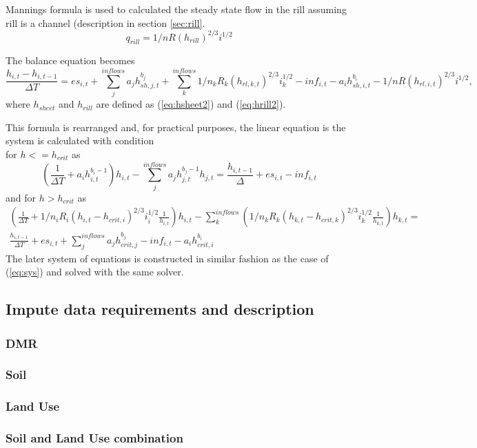         Mannings formula is used to calculated the steady state flow in
        the rill assuming rill is a channel (description in section \ref{sec:rill}.  
        $$
        q_{rill} = 1/n R(h_{rill})^{2/3} i^{1/2}
        $$


        The balance equation becomes
        $$
          \frac{h_{i,t} - h_{i,t-1} }{\Delta T} = 
          es_{i,t} + \sum_j^{inflows} a_jh^{b_{j}}_{sh,j,t}  + \sum_k^{inflows} 1/n_k R_k(h_{rl,k,t})^{2/3} i_k^{1/2} - inf_{i,t} - a_ih^{b_{i}}_{sh,i,t} - 1/n R(h_{rl,i,t})^{2/3} i^{1/2},
        $$
        where $h_{sheet}$ and $h_{rill}$ are defined as (\ref{eq:hsheet2}) and  (\ref{eq:hrill2}).

        This formula is rearranged and, for practical purposes, the linear equation is the system is calculated with condition \\
        for  $h<=h_{crit}$ as
        \begin{equation}
            \left(\frac{1}{\Delta T}+a_ih^{b_{i}-1}_{i,t}\right)h_{i,t} -  \sum_j^{inflows} a_jh^{b_{j}-1}_{j,t} h_{j,t} = \frac{h_{i,t-1}}{\Delta} +  es_{i,t} - inf_{i,t}
        \end{equation}
        and for  $h>h_{crit}$ as
        \begin{multline}
          \left(\frac{1}{\Delta T}
          + 1/n_i R_i(h_{i,t}-h_{crit,i})^{2/3} i_i^{1/2} \frac{1}{h_{i,t}}\right)h_{i,t}
            - \sum_k^{inflows} \left( 1/n_k R_k(h_{k,t}-h_{crit,k})^{2/3} i_k^{1/2}  \frac{1}{h_{k,t}}\right)h_{k,t}
          =  \\
          \frac{h_{i,t-1} }{\Delta T}
          + es_{i,t} 
          + \sum_j^{inflows} a_j h^{b_{j}}_{crit,j}  
          - inf_{i,t} 
          - a_i h^{b_{i}}_{crit,i} 
        \end{multline}
    The later system of equations is constructed in similar fashion as the case of (\ref{eq:sys}) and solved with the same solver.

    \subsection{Impute data requirements and description}

        
        \subsubsection{DMR}
        \subsubsection{Soil}
        \subsubsection{Land Use}
        \subsubsection{Soil and Land Use  combination}
